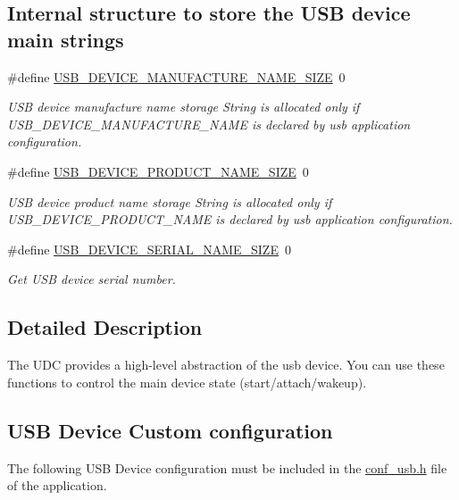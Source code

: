 \subsection*{\-Internal structure to store the \-U\-S\-B device main strings}
\begin{DoxyCompactItemize}
\item 
\#define \hyperlink{group__udc__group_gac2dafd8d9efe73f2709291818829a79b}{\-U\-S\-B\-\_\-\-D\-E\-V\-I\-C\-E\-\_\-\-M\-A\-N\-U\-F\-A\-C\-T\-U\-R\-E\-\_\-\-N\-A\-M\-E\-\_\-\-S\-I\-Z\-E}~0
\begin{DoxyCompactList}\small\item\em \-U\-S\-B device manufacture name storage \-String is allocated only if \-U\-S\-B\-\_\-\-D\-E\-V\-I\-C\-E\-\_\-\-M\-A\-N\-U\-F\-A\-C\-T\-U\-R\-E\-\_\-\-N\-A\-M\-E is declared by usb application configuration. \end{DoxyCompactList}\item 
\#define \hyperlink{group__udc__group_ga76a9e0f1f322165feaf0a8f2f583ea8f}{\-U\-S\-B\-\_\-\-D\-E\-V\-I\-C\-E\-\_\-\-P\-R\-O\-D\-U\-C\-T\-\_\-\-N\-A\-M\-E\-\_\-\-S\-I\-Z\-E}~0
\begin{DoxyCompactList}\small\item\em \-U\-S\-B device product name storage \-String is allocated only if \-U\-S\-B\-\_\-\-D\-E\-V\-I\-C\-E\-\_\-\-P\-R\-O\-D\-U\-C\-T\-\_\-\-N\-A\-M\-E is declared by usb application configuration. \end{DoxyCompactList}\item 
\#define \hyperlink{group__udc__group_gacf4c1ef7c6001ee2b919e81143543899}{\-U\-S\-B\-\_\-\-D\-E\-V\-I\-C\-E\-\_\-\-S\-E\-R\-I\-A\-L\-\_\-\-N\-A\-M\-E\-\_\-\-S\-I\-Z\-E}~0
\begin{DoxyCompactList}\small\item\em \-Get \-U\-S\-B device serial number. \end{DoxyCompactList}\end{DoxyCompactItemize}


\subsection{\-Detailed \-Description}
\-The \-U\-D\-C provides a high-\/level abstraction of the usb device. \-You can use these functions to control the main device state (start/attach/wakeup).\hypertarget{group__udc__group_USB_DEVICE_CONF}{}\subsection{\-U\-S\-B Device Custom configuration}\label{group__udc__group_USB_DEVICE_CONF}
\-The following \-U\-S\-B \-Device configuration must be included in the \hyperlink{conf__usb_8h}{conf\-\_\-usb.\-h} file of the application.

